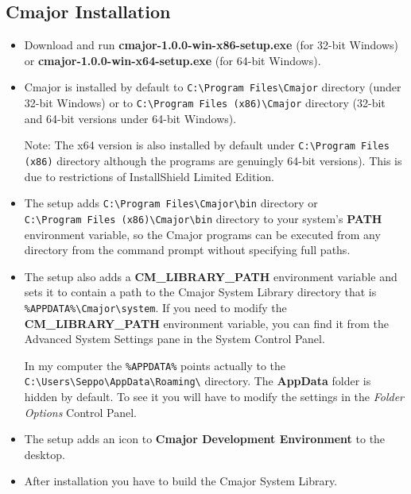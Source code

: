 \documentclass[oneside, a4paper, 11pt]{article}
\begin{document}
\subsection{Cmajor Installation}

\begin{itemize}

\item
Download and run \textbf{cmajor-1.0.0-win-x86-setup.exe} (for 32-bit Windows) or
\textbf{cmajor-1.0.0-win-x64-setup.exe} (for 64-bit Windows).

\item
Cmajor is installed by default to \verb|C:\Program Files\Cmajor| directory (under 32-bit Windows) or
to \verb|C:\Program Files (x86)\Cmajor| directory (32-bit and 64-bit versions under 64-bit Windows).

Note: The x64 version is also installed by default under
\verb|C:\Program Files (x86)| directory although the programs are genuingly 64-bit versions).
This is due to restrictions of InstallShield Limited Edition.

\item
The setup adds \verb|C:\Program Files\Cmajor\bin| directory or \\
\verb|C:\Program Files (x86)\Cmajor\bin| directory
to your system's \textbf{PATH} environment variable, so the Cmajor programs can be executed from any
directory from the command prompt without specifying full paths.

\item
The setup also adds a \textbf{CM\_LIBRARY\_PATH} environment variable and
sets it to contain a path to the Cmajor System Library directory
that is \verb|%APPDATA%\Cmajor\system|. If you need to modify the
\textbf{CM\_LIBRARY\_PATH} environment variable, you can find it from the Advanced System Settings pane in the System Control Panel.

In my computer the \verb|%APPDATA%| points actually to the
\verb|C:\Users\Seppo\AppData\Roaming\| directory. The \textbf{AppData} folder
is hidden by default. To see it you will have to modify the settings in
the \emph{Folder Options} Control Panel.

\item
The setup adds an icon to \textbf{Cmajor Development Environment} to the desktop.

\item
After installation you have to build the Cmajor System Library.

\end{itemize}
\end{document}
